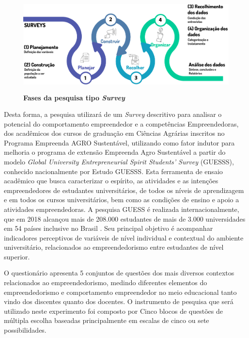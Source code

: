 \begin{figure}[!htb]
\centering
\caption{\textbf{Fases da pesquisa tipo \textit{Survey}}}
\includegraphics[scale=0.4]{Imagens/diagrama_survey.png}
\label{figura_8}
\end{figure}

Desta forma, a pesquisa utilizará de um \textit{Survey} descritivo para analisar o potencial do comportamento empreendedor e a competências Empreendedoras, dos acadêmicos dos cursos de graduação em Ciências Agrárias inscritos no Programa Empreenda AGRO Sustentável, utilizando como fator indutor para melhoria o programa de extensão Empreenda Agro Sustentável a partir do modelo \textit{Global University Entrepreneurial Spirit Students’ Survey} (GUESSS), conhecido nacionalmente por Estudo GUESSS. Esta ferramenta de ensaio acadêmico que busca caracterizar o espírito, as atividades e as intenções empreendedores de estudantes universitários, de todos os níveis de aprendizagem e em todos os cursos universitários, bem como as condições de ensino e apoio a atividades empreendedoras. A pesquisa GUESS é realizada internacionalmente,  que em 2018 alcançou mais de 208.000 estudantes de mais de 3.000 universidades em 54 países inclusive no Brasil \cite{sieger_global_2018}.  Seu  principal  objetivo  é  acompanhar  indicadores perceptivos   de   variáveis   de   nível individual   e   contextual   do   ambiente   universitário, relacionados ao empreendedorismo entre estudantes de nível superior.

O questionário apresenta 5 conjuntos de questões dos mais diversos contextos relacionados ao empreendedorismo, medindo diferentes elementos do empreendedorismo e comportamento empreendedor no meio educacional tanto vindo dos discentes quanto dos docentes. O instrumento de pesquisa que será utilizado neste experimento foi composto por Cinco blocos de questões de múltipla escolha baseadas principalmente em escalas de cinco ou sete possibilidades. 

